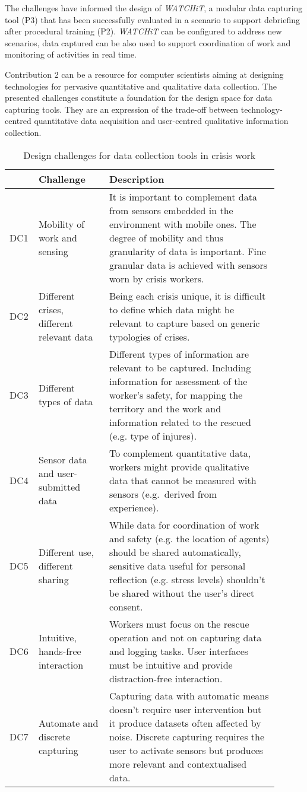 The challenges have informed the design of \emph{WATCHiT}, a modular data capturing tool (P3) that has been successfully evaluated in a scenario to support debriefing after procedural training (P2). \emph{WATCHiT} can be configured to address new scenarios, data captured can be also used to support coordination of work and monitoring of activities in real time.

Contribution 2 can be a resource for computer scientists aiming at designing technologies for pervasive quantitative and qualitative data collection. The presented challenges constitute a foundation for the design space for data capturing tools. They are an expression of the trade-off between technology-centred quantitative data acquisition and user-centred qualitative information collection.

\begin{table}
	[p] \centering \caption{Design challenges for data collection tools in crisis work} \label{tab:design-challenges} 
	\begin{tabular}
		{@{}p{0.05\linewidth}p{0.25\linewidth}p{0.60\linewidth}@{}} \toprule & Challenge & Description \\
		\midrule DC1 & Mobility of work and sensing & It is important to complement data from sensors embedded in the environment with mobile ones. The degree of mobility and thus granularity of data is important. Fine granular data is achieved with sensors worn by crisis workers. \\
		DC2 & Different crises, different relevant data & Being each crisis unique, it is difficult to define which data might be relevant to capture based on generic typologies of crises. \\
		DC3 & Different types of data & Different types of information are relevant to be captured. Including information for assessment of the worker’s safety, for mapping the territory and the work and information related to the rescued (e.g. type of injures). \\
		DC4 & Sensor data and user-submitted data & To complement quantitative data, workers might provide qualitative data that cannot be measured with sensors (e.g.~derived from experience). \\
		DC5 & Different use, different sharing & While data for coordination of work and safety (e.g. the location of agents) should be shared automatically, sensitive data useful for personal reflection (e.g. stress levels) shouldn't be shared without the user's direct consent. \\
		DC6 & Intuitive, hands-free interaction & Workers must focus on the rescue operation and not on capturing data and logging tasks. User interfaces must be intuitive and provide distraction-free interaction. \\
		DC7 & Automate and discrete capturing & Capturing data with automatic means doesn't require user intervention but it produce datasets often affected by noise. Discrete capturing requires the user to activate sensors but produces more relevant and contextualised data. \\
		\bottomrule 
	\end{tabular}
\end{table}


